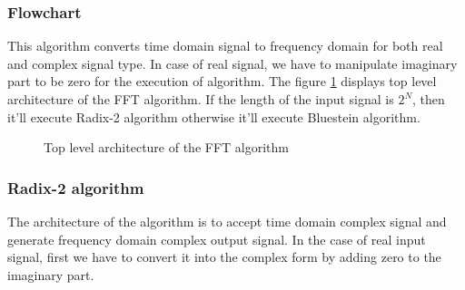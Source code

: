 \subsubsection{Flowchart}
This algorithm converts time domain signal to frequency domain for both real and complex signal type. In case of real signal, we have to manipulate imaginary part to be zero for the execution of algorithm.
The figure \ref{Top_level_FFT } displays top level architecture of the FFT algorithm.  If the length of the input signal is $2^N$, then it'll execute Radix-2 algorithm otherwise it'll execute Bluestein algorithm.

\begin{center}
\begin{figure}[ht]

\begin{center}
\end{center}
\vspace{0.5cm}
\caption{Top level architecture of the FFT algorithm}
\label{Top_level_FFT }
\end{figure}
\end{center}

\newpage
\subsubsection{Radix-2 algorithm}
The architecture of the algorithm is to accept time domain complex signal and generate frequency domain complex output signal. In the case of real input signal, first we have to convert it into the complex form by adding zero to the imaginary part. 

